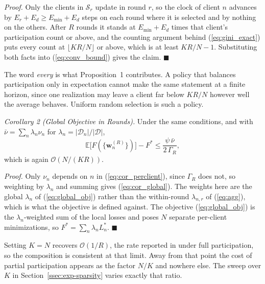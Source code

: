 \documentclass[journal]{IEEEtran}
\newcommand{\rev}[1]{{\color{blue}#1}}
\begin{document}
\rev{\textit{Proof.} Only the clients in $\mathcal{S}_r$ update in round $r$, so the clock of client $n$ advances by $E_r + E_d \ge E_{\min} + E_d$ steps on each round where it is selected and by nothing on the others. After $R$ rounds it stands at $E_{\min}+E_d$ times that client's participation count or above, and the counting argument behind (\ref{eq:gini_exact}) puts every count at $\lfloor KR/N \rfloor$ or above, which is at least $KR/N - 1$. Substituting both facts into (\ref{eq:conv_bound}) gives the claim. \hfill$\blacksquare$}

\rev{The word \emph{every} is what Proposition~1 contributes. A policy that balances participation only in expectation cannot make the same statement at a finite horizon, since one realization may leave a client far below $KR/N$ however well the average behaves. Uniform random selection is such a policy.}

\rev{\textit{Corollary 2 (Global Objective in Rounds).} Under the same conditions, and with $\bar{\nu} = \sum_{n} \lambda_n \nu_n$ for $\lambda_n = |\mathcal{D}_n| / |\mathcal{D}|$,}
\begin{equation}
\mathbb{E}\bigl[F(\{\bm{w}_n^{(R)}\})\bigr] - F^{*} \le \frac{\psi\, \bar{\nu}}{2\,\Gamma_R},
\label{eq:cor_global}
\end{equation}
\rev{which is again $\mathcal{O}(N/(KR))$.}

\rev{\textit{Proof.} Only $\nu_n$ depends on $n$ in (\ref{eq:cor_perclient}), since $\Gamma_R$ does not, so weighting by $\lambda_n$ and summing gives (\ref{eq:cor_global}). The weights here are the global $\lambda_n$ of (\ref{eq:global_obj}) rather than the within-round $\lambda_{n,r}$ of (\ref{eq:agg}), which is what the objective is defined against. The objective (\ref{eq:global_obj}) is the $\lambda_n$-weighted sum of the local losses and \cite{mu2024fedtskd} poses $N$ separate per-client minimizations, so $F^{*} = \sum_n \lambda_n L_n^{*}$. \hfill$\blacksquare$}

\rev{Setting $K = N$ recovers $\mathcal{O}(1/R)$, the rate reported in \cite{mu2024fedtskd} under full participation, so the composition is consistent at that limit. Away from that point the cost of partial participation appears as the factor $N/K$ and nowhere else. The sweep over $K$ in Section~\ref{ssec:exp-sparsity} varies exactly that ratio.}
\end{document}
